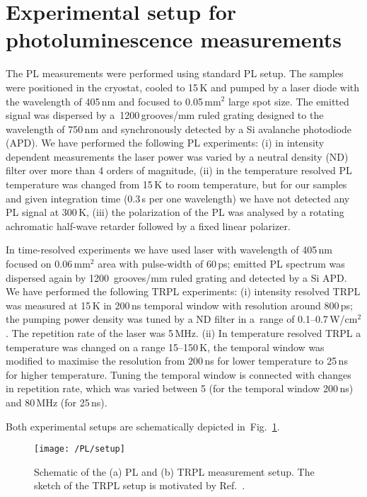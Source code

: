 

\section{Experimental setup for photoluminescence measurements}
The PL measurements were performed using standard PL setup. The samples were positioned in the cryostat, cooled to 15$\,$K and pumped by a laser diode with the wavelength of 405$\,$nm and focused to 0.05$\,$mm$^2$ large spot size. The emitted signal was dispersed by a~1200$\,$grooves/mm ruled grating designed to the wavelength of 750$\,$nm and synchronously detected by a Si avalanche photodiode (APD). We have performed the following PL experiments: (i) in intensity dependent measurements the laser power was varied by a neutral density (ND) filter over more than 4 orders of magnitude, (ii) in the temperature resolved PL temperature was changed from 15$\,$K to room temperature, but for our samples and given integration time (0.3$\,$s per one wavelength) we have not detected any PL signal at 300$\,$K, (iii) the polarization of the PL was analysed by a rotating achromatic half-wave retarder followed by a fixed linear polarizer.

In time-resolved experiments we have used laser with wavelength of 405$\,$nm focused on 0.06$\,$mm$^2$ area with pulse-width of 60$\,$ps; emitted PL spectrum was dispersed again by 1200~grooves/mm ruled grating and detected by a Si APD. We have performed the following TRPL experiments: (i) intensity resolved TRPL was measured at 15$\,$K in 200$\,$ns temporal window with resolution around 800$\,$ps; the pumping power density was tuned by a ND filter in a~range of 0.1--0.7$\,$W/cm$^2$. The repetition rate of the laser was 5$\,$MHz. (ii) In temperature resolved TRPL a temperature was changed on a range 15--150$\,$K, the temporal window was modified to maximise the resolution from 200$\,$ns for lower temperature to 25$\,$ns for higher temperature. Tuning the temporal window is connected with changes in repetition rate, which was varied between 5 (for the temporal window 200$\,$ns) and 80$\,$MHz (for 25$\,$ns).

Both experimental setups are schematically depicted in~Fig.~\ref{fig:Madrid_setup}.
\begin{figure}
	\centering
	\texttt{[image: /PL/setup]}
	\caption{Schematic of the (a) PL and (b) TRPL measurement setup. The sketch of the TRPL setup is motivated by Ref.~\citep{TRPL_setup}.}
	\label{fig:Madrid_setup}
\end{figure}


